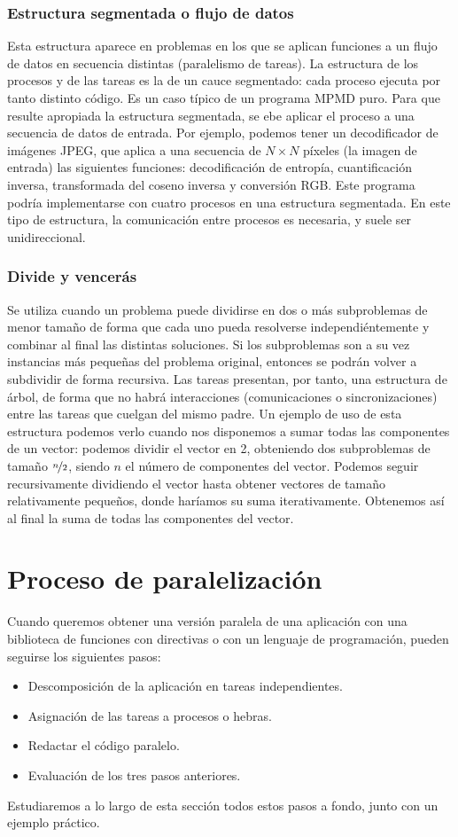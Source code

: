 \subsubsection{Estructura segmentada o flujo de datos} 
Esta estructura aparece en problemas en los que se aplican funciones a un flujo de datos en secuencia distintas (paralelismo de tareas). La estructura de los procesos y de las tareas es la de un cauce segmentado: cada proceso ejecuta por tanto distinto código. Es un caso típico de un programa MPMD puro. Para que resulte apropiada la estructura segmentada, se ebe aplicar el proceso a una secuencia de datos de entrada.
Por ejemplo, podemos tener un decodificador de imágenes JPEG, que aplica a una secuencia de $N\times N$ píxeles (la imagen de entrada) las siguientes funciones: decodificación de entropía, cuantificación inversa, transformada del coseno inversa y conversión RGB. Este programa podría implementarse con cuatro procesos en una estructura segmentada.
En este tipo de estructura, la comunicación entre procesos es necesaria, y suele ser unidireccional.

\subsubsection{Divide y vencerás} 
Se utiliza cuando un problema puede dividirse en dos o más subproblemas de menor tamaño de forma que cada uno pueda resolverse independiéntemente y combinar al final las distintas soluciones. Si los subproblemas son a su vez instancias más pequeñas del problema original, entonces se podrán volver a subdividir de forma recursiva. Las tareas presentan, por tanto, una estructura de árbol, de forma que no habrá interacciones (comunicaciones o sincronizaciones) entre las tareas que cuelgan del mismo padre.
Un ejemplo de uso de esta estructura podemos verlo cuando nos disponemos a sumar todas las componentes de un vector: podemos dividir el vector en 2, obteniendo dos subproblemas de tamaño $ \nicefrac{n}{2} $, siendo $n$ el número de componentes del vector. Podemos seguir recursivamente dividiendo el vector hasta obtener vectores de tamaño relativamente pequeños, donde haríamos su suma iterativamente. Obtenemos así al final la suma de todas las componentes del vector.

\newpage
\section{Proceso de paralelización}
Cuando queremos obtener una versión paralela de una aplicación con una biblioteca de funciones con directivas o con un lenguaje de programación, pueden seguirse los siguientes pasos:
\begin{itemize}
    \item Descomposición de la aplicación en tareas independientes.
    \item Asignación de las tareas a procesos o hebras. 
    \item Redactar el código paralelo. 
    \item Evaluación de los tres pasos anteriores.
\end{itemize}
Estudiaremos a lo largo de esta sección todos estos pasos a fondo, junto con un ejemplo práctico.

